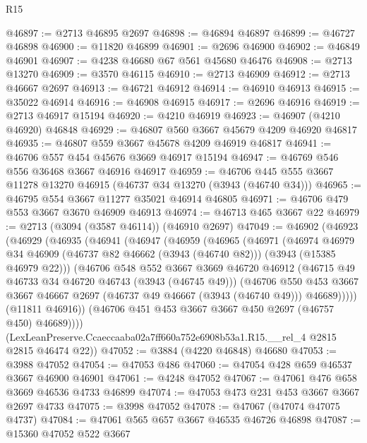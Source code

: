 \begin{lexlean}{R15}
\begin{coremodule}
@46897 := @2713 @46895 @2697
@46898 := @46894 @46897
@46899 := @46727 @46898
@46900 := @11820 @46899
@46901 := @2696 @46900
@46902 := @46849 @46901
@46907 := @4238 @46680 @67 @561 @45680 @46476
@46908 := @2713 @13270
@46909 := @3570 @46115
@46910 := @2713 @46909
@46912 := @2713 @46667 @2697
@46913 := @46721 @46912
@46914 := @46910 @46913
@46915 := @35022 @46914
@46916 := @46908 @46915
@46917 := @2696 @46916
@46919 := @2713 @46917 @15194
@46920 := @4210 @46919
@46923 := @46907 (@4210 @46920) @46848
@46929 := @46807 @560 @3667 @45679 @4209 @46920 @46817
@46935 := @46807 @559 @3667 @45678 @4209 @46919 @46817
@46941 := @46706 @557 @454 @45676 @3669 @46917 @15194
@46947 := @46769 @546 @556 @36468 @3667 @46916 @46917
@46959 := @46706 @445 @555 @3667 @11278 @13270 @46915 (@46737 @34 @13270 (@3943 (@46740 @34)))
@46965 := @46795 @554 @3667 @11277 @35021 @46914 @46805
@46971 := @46706 @479 @553 @3667 @3670 @46909 @46913
@46974 := @46713 @465 @3667 @22
@46979 := @2713 (@3094 (@3587 @46114)) (@46910 @2697)
@47049 := @46902
    (@46923
      (@46929
        (@46935
          (@46941
            (@46947
              (@46959
                (@46965
                  (@46971
                    (@46974
                      @46979
                      @34
                      @46909
                      (@46737 @82 @46662 (@3943 (@46740 @82)))
                      (@3943 (@15385 @46979 @22)))
                    (@46706
                      @548
                      @552
                      @3667
                      @3669
                      @46720
                      @46912
                      (@46715 @49 @46733 @34 @46720 @46743 (@3943 (@46745 @49)))
                      (@46706
                        @550
                        @453
                        @3667
                        @3667
                        @46667
                        @2697
                        (@46737 @49 @46667 (@3943 (@46740 @49)))
                        @46689)))))
              (@11811 @46916))
            (@46706 @451 @453 @3667 @3667 @450 @2697 (@46757 @450) @46689))))
      (LexLeanPreserve.Ccaeccaaba02a7ff660a752e6908b53a1.R15.__rel_4 @2815 @2815 @46474 @22))
@47052 := @3884 (@4220 @46848) @46680
@47053 := @3988 @47052
@47054 := @47053 @486
@47060 := @47054 @428 @659 @46537 @3667 @46900 @46901
@47061 := @4248 @47052
@47067 := @47061 @476 @658 @3669 @46536 @4733 @46899
@47074 := @47053 @473 @231 @453 @3667 @3667 @2697 @4733
@47075 := @3998 @47052
@47078 := @47067 (@47074 @47075 @4737)
@47084 := @47061 @565 @657 @3667 @46535 @46726 @46898
@47087 := @15360 @47052 @522 @3667

\end{coremodule}
\end{lexlean}
